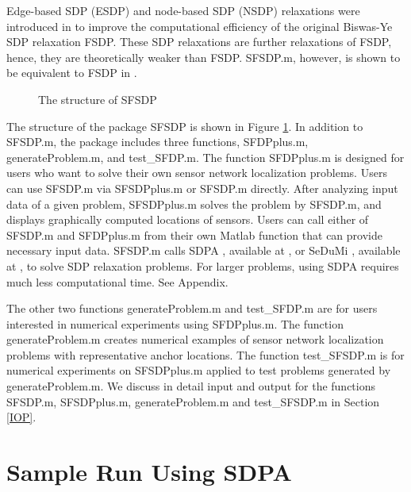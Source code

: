 \documentclass[12pt]{article}
\begin{document}
Edge-based SDP (ESDP) and node-based SDP (NSDP) relaxations were introduced in \cite{WANG07}
to improve the computational efficiency of the original Biswas-Ye SDP relaxation 
FSDP. These  SDP relaxations
are further relaxations of FSDP, hence, they are theoretically
weaker than FSDP. SFSDP.m, however,  is shown to be equivalent
to FSDP in \cite{KIM08}.

\begin{figure}
\label{structure}
\begin{center}
\hspace*{-3cm}
\vspace*{-3cm}
\caption{The structure of SFSDP}
\label{STRUCTURE}
\end{center}
\end{figure}


The structure of the  package SFSDP is shown in Figure \ref{STRUCTURE}. 
In addition to SFSDP.m, the package includes three functions, SFDPplus.m, generateProblem.m, 
and test\_SFDP.m. 
The function SFDPplus.m is designed for users who want to solve their own sensor network localization 
problems.  Users can use SFSDP.m via SFSDPplus.m or SFSDP.m directly.  
After analyzing input data of a given problem, SFSDPplus.m  solves the problem by SFSDP.m, and 
displays graphically  computed locations of sensors.  Users can call either of 
SFSDP.m and SFDPplus.m from their own Matlab function that can provide necessary input 
data.  SFSDP.m calls SDPA \cite{FUJISAWA08}, available 
at \cite{SDPA}, or SeDuMi \cite{STURM99}, available at \cite{SEDUMI}, 
 to solve SDP relaxation problems.  
 For larger problems, using SDPA requires much less computational time. See Appendix. 

The other two functions 
generateProblem.m and test\_SFDP.m are for users interested in numerical 
experiments using SFDPplus.m.  The function generateProblem.m 
creates numerical examples of sensor network localization problems with representative
anchor locations. The function test\_SFSDP.m is for numerical experiments on SFSDPplus.m 
applied to test problems  generated by generateProblem.m. 
We discuss in detail input and output for the functions 
SFSDP.m,  SFSDPplus.m, generateProblem.m and test\_SFSDP.m  in Section \ref{IOP}.

\section{Sample Run Using SDPA}
\label{EXEC}
\end{document}
